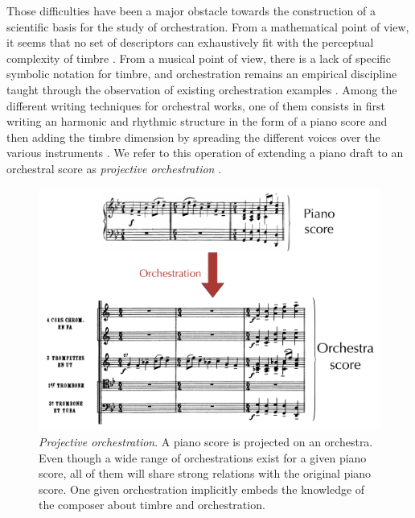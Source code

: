 \documentclass[letterpaper]{article}
\begin{document}
Those difficulties have been a major obstacle towards the construction of a scientific basis for the study of orchestration. From a mathematical point of view, it seems that no set of descriptors can exhaustively fit with the perceptual complexity of timbre \cite{peeters2011timbre}. From a musical point of view, there is a lack of specific symbolic notation for timbre, and orchestration remains an empirical discipline taught through the observation of existing orchestration examples \cite{piston-orch}. Among the different writing techniques for orchestral works, one of them consists in first writing an harmonic and rhythmic structure in the form of a piano score and then adding the timbre dimension by spreading the different voices over the various instruments \cite{piston-orch}. We refer to this operation of extending a piano draft to an orchestral score as \textit{projective orchestration} \cite{eslingthesis}.

\begin{figure}
\centering
\includegraphics[scale=0.12]{orch}
\caption{\textit{Projective orchestration}. A piano score is projected on an orchestra. Even though a wide range of orchestrations exist for a given piano score, all of them will share strong relations with the original piano score. One given orchestration implicitly embeds the knowledge of the composer about timbre and orchestration.}
\label{fig:orch}
\end{figure}
\end{document}
